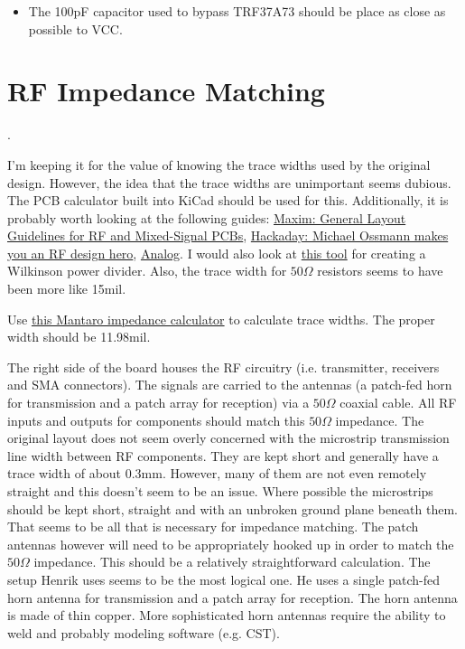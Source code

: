 \documentclass{default}
\begin{document}
\begin{itemize}
\item The 100pF capacitor used to bypass TRF37A73 should be place as close as possible to VCC.
\end{itemize}

\section{RF Impedance Matching}

.

I'm keeping it for the value of knowing the trace
  widths used by the original design. However, the idea that the trace widths are unimportant seems
  dubious. The PCB calculator built into KiCad should be used for this. Additionally, it is probably
  worth looking at the following guides:
  \href{https://www.maximintegrated.com/en/app-notes/index.mvp/id/5100#}{Maxim: General Layout
    Guidelines for RF and Mixed-Signal PCBs},
  \href{https://hackaday.com/2016/03/23/michael-ossmann-makes-you-an-rf-design-hero/}{Hackaday:
    Michael Ossmann makes you an RF design hero},
  \href{https://www.analog.com/media/en/training-seminars/design-handbooks/Basic-Linear-Design/Chapter12.pdf}{Analog}. I
  would also look at \href{https://github.com/erichVK5/WilkinsonPowerDividerFootprintGenerator}{this
    tool} for creating a Wilkinson power divider. Also, the trace width for $50\si{\Omega}$
  resistors seems to have been more like 15mil.

  Use \href{http://www.mantaro.com/resources/impedance-calculator.htm}{this Mantaro impedance calculator} to calculate
  trace widths. The proper width should be 11.98mil.

The right side of the board houses the RF circuitry (i.e. transmitter, receivers and SMA
connectors). The signals are carried to the antennas (a patch-fed horn for transmission and a patch
array for reception) via a $50\si{\Omega}$ coaxial cable. All RF inputs and outputs for components
should match this $50\si{\Omega}$ impedance. The original layout does not seem overly concerned with
the microstrip transmission line width between RF components. They are kept short and generally have
a trace width of about 0.3mm. However, many of them are not even remotely straight and this doesn't
seem to be an issue. Where possible the microstrips should be kept short, straight and with an
unbroken ground plane beneath them. That seems to be all that is necessary for impedance
matching. The patch antennas however will need to be appropriately hooked up in order to match the
$50\si{\Omega}$ impedance. This should be a relatively straightforward calculation. The setup Henrik
uses seems to be the most logical one. He uses a single patch-fed horn antenna for transmission and
a patch array for reception. The horn antenna is made of thin copper. More sophisticated horn
antennas require the ability to weld and probably modeling software (e.g. CST).
\end{document}
